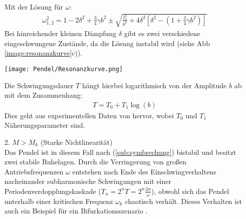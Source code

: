 \begin{itemize}
    Mit der Lösung für $\omega$:
    \begin{gather}
        \omega^2_{1,2} = 1 - 2\delta^2 + \frac{3}{4}\gamma b^2 \pm \sqrt{\frac{f_a^2}{b^2}+ 4\delta^2\left[\delta^2 - \left(1 + \frac{3}{4}\gamma b^2\right)\right]}
    \end{gather}
    Bei hinreichender kleinen Dämpfung $\delta$ gibt es zwei verschiedene eingeschwungene Zustände, da die Lösung instabil wird (siehe Abb \ref{image:resonanzkurve}c)).
    \begin{center}
        \texttt{[image: Pendel/Resonanzkurve.png]}
        \label{image:resonanzkurve}
    \end{center}
    Die Schwingungsdauer $T$ hängt hierbei logarithmisch von der Amplitude $b$ ab mit dem Zusammenhang:
    \begin{gather}
        T = T_0 + T_1\log(b)
    \end{gather}
    Dies geht aus experimentellen Daten von \citep{Lueck} hervor, wobei $T_0$ und $T_1$ Näherungsparameter sind.
    \item[2.] $M>M_k$ (Starke Nichtlinearität)\\
    Das Pendel ist in diesem Fall nach (\ref{sub:symbrechung}) bistabil und besitzt zwei stabile Ruhelagen. Durch die Verringerung von großen Antriebsfrequenzen $\omega$ entstehen nach Ende des Einschwingverhaltens nacheinander subharmonische Schwingungen mit einer Periodenverdopplungskaskade ($T_n=2^nT=2^n\frac{2\pi}{\omega}$), obwohl sich das Pendel unterhalb einer kritischen Frequenz $\omega_k$ chaotisch verhält. Dieses Verhalten ist auch ein Beispiel für ein Bifurkationsszenario \citep{Lueck}.
\end{itemize}
\newpage

